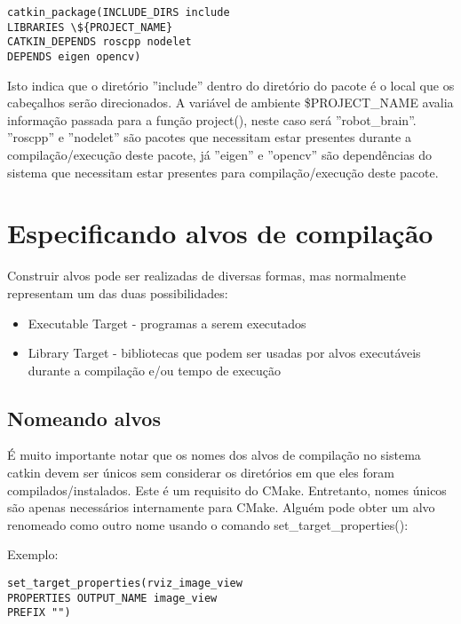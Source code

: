 \begin{verbatim} 
catkin_package(INCLUDE_DIRS include
LIBRARIES \${PROJECT_NAME}
CATKIN_DEPENDS roscpp nodelet
DEPENDS eigen opencv)
\end{verbatim}

Isto indica que o diretório ''include'' dentro do diretório do pacote é o local que os cabeçalhos serão direcionados. A variável de ambiente \${PROJECT\_NAME} avalia informação passada para a função project(), neste caso será ''robot\_brain''. ''roscpp'' e ''nodelet'' são pacotes que necessitam estar presentes durante a compilação/execução deste pacote, já ''eigen'' e ''opencv'' são dependências do sistema que necessitam estar presentes para compilação/execução deste pacote.

\section{Especificando alvos de compilação}

Construir alvos pode ser realizadas de diversas formas, mas normalmente representam um das duas possibilidades:

\begin{itemize}
	\setlength{\itemsep}{1pt}
	\setlength{\parskip}{0pt}
	\setlength{\parsep}{0pt}
	\item[]Executable Target - programas a serem executados
	\item[]Library Target - bibliotecas que podem ser usadas por alvos executáveis durante a compilação e/ou tempo de execução
\end{itemize}

\subsection{Nomeando alvos}

É muito importante notar que os nomes dos alvos de compilação no sistema catkin devem ser únicos sem considerar os diretórios em que eles foram compilados/instalados. Este é um requisito do CMake. Entretanto, nomes únicos são apenas necessários internamente para CMake. Alguém pode obter um alvo renomeado como outro nome usando o comando set\_target\_properties():

Exemplo:

\begin{verbatim}
set_target_properties(rviz_image_view
PROPERTIES OUTPUT_NAME image_view
PREFIX "")
\end{verbatim}

